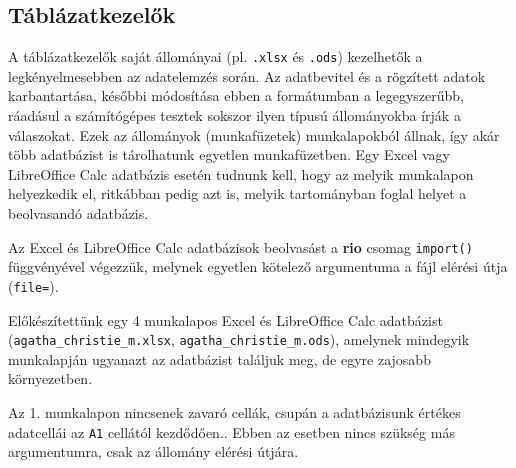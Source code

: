 \documentclass[
]{book}
\begin{document}
\hypertarget{tuxe1bluxe1zatkezelux151k}{%
\subsection{Táblázatkezelők}\label{tuxe1bluxe1zatkezelux151k}}

A táblázatkezelők saját állományai (pl. \texttt{.xlsx} és \texttt{.ods}) kezelhetők a legkényelmesebben az adatelemzés során. Az adatbevitel és a rögzített adatok karbantartása, későbbi módosítása ebben a formátumban a legegyszerűbb, ráadásul a számítógépes tesztek sokszor ilyen típusú állományokba írják a válaszokat. Ezek az állományok (munkafüzetek) munkalapokból állnak, így akár több adatbázist is tárolhatunk egyetlen munkafüzetben. Egy Excel vagy LibreOffice Calc adatbázis esetén tudnunk kell, hogy az melyik munkalapon helyezkedik el, ritkábban pedig azt is, melyik tartományban foglal helyet a beolvasandó adatbázis.

Az Excel és LibreOffice Calc adatbázisok beolvasást a \textbf{rio} csomag \texttt{import()} függvényével végezzük, melynek egyetlen kötelező argumentuma a fájl elérési útja (\texttt{file=}).

Előkészítettünk egy 4 munkalapos Excel és LibreOffice Calc adatbázist (\texttt{agatha\_christie\_m.xlsx}, \texttt{agatha\_christie\_m.ods}), amelynek mindegyik munkalapján ugyanazt az adatbázist találjuk meg, de egyre zajosabb környezetben.

Az 1. munkalapon nincsenek zavaró cellák, csupán a adatbázisunk értékes adatcellái az \texttt{A1} cellától kezdődően.. Ebben az esetben nincs szükség más argumentumra, csak az állomány elérési útjára.
\end{document}
